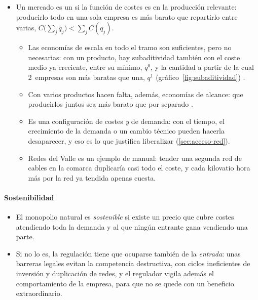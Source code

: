 \documentclass[11pt]{article}
\begin{document}
\begin{itemize}
\item Un mercado es un  si la función de costes es  en la producción relevante: producirlo todo en una sola empresa es más barato que repartirlo entre varias, $C\big(\sum_jq_j\big)<\sum_jC(q_j)$\nocite{Baumol1977Proper}.
  \begin{itemize}
  \item Las economías de escala en todo el tramo son suficientes, pero no necesarias: con un producto, hay subaditividad también con el coste medio ya creciente, entre su mínimo, $q^0$, y la cantidad a partir de la cual 2~empresas son más baratas que una, $q^1$ (gráfico~\ref{fig:subaditividad}) .
  \item Con varios productos hacen falta, además, economías de alcance: que producirlos juntos sea más barato que por separado\nocite{BaumolPanzarWillig1982Contestable} .
  \item Es una configuración de costes \emph{y} de demanda: con el tiempo, el crecimiento de la demanda o un cambio técnico pueden hacerla desaparecer, y eso es lo que justifica liberalizar (\ref{sec:acceso-red}).
  \end{itemize}
  \begin{itemize}
  \item Redes del Valle es un ejemplo de manual: tender una segunda red de cables en la comarca duplicaría casi todo el coste, y cada kilovatio hora más por la red ya tendida apenas cuesta.
  \end{itemize}
\end{itemize}

\paragraph{Sostenibilidad}

\begin{itemize}
\item El monopolio natural es \emph{sostenible} si existe un precio que cubre costes atendiendo toda la demanda y al que ningún entrante gana vendiendo una parte\nocite{PanzarWillig1977Free,BaumolBaileyWillig1977Weak}.
\item Si no lo es, la regulación tiene que ocuparse también de la \emph{entrada}: unas barreras legales evitan la competencia destructiva, con ciclos ineficientes de inversión y duplicación de redes, y el regulador vigila además el comportamiento de la empresa, para que no se quede con un beneficio extraordinario.
\end{itemize}
\end{document}
